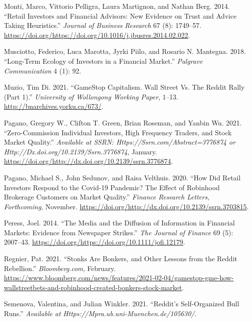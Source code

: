 \documentclass[12pt,]{article}
\begin{document}
\leavevmode\hypertarget{ref-monti2014}{}%
Monti, Marco, Vittorio Pelligra, Laura Martignon, and Nathan Berg. 2014.
``Retail Investors and Financial Advisors: New Evidence on Trust and
Advice Taking Heuristics.'' \emph{Journal of Business Research} 67 (8):
1749--57.
\url{https://doi.org/https://doi.org/10.1016/j.jbusres.2014.02.022}.

\leavevmode\hypertarget{ref-musciotto2018}{}%
Musciotto, Federico, Luca Marotta, Jyrki Piilo, and Rosario N. Mantegna.
2018. ``Long-Term Ecology of Investors in a Financial Market.''
\emph{Palgrave Communication} 4 (1): 92.

\leavevmode\hypertarget{ref-dimuzio2021}{}%
Muzio, Tim Di. 2021. ``GameStop Capitalism. Wall Street Vs. The Reddit
Rally (Part 1).'' \emph{University of Wollongong Working Paper}, 1--13.
\url{http://bnarchives.yorku.ca/673/}.

\leavevmode\hypertarget{ref-eaton2021}{}%
Pagano, Gregory W., Clifton T. Green, Brian Roseman, and Yanbin Wu.
2021. ``Zero-Commission Individual Investors, High Frequency Traders,
and Stock Market Quality.'' \emph{Available at SSRN:
Https://Ssrn.com/Abstract=3776874 or
Http://Dx.doi.org/10.2139/Ssrn.3776874}, January.
\url{https://doi.org/http://dx.doi.org/10.2139/ssrn.3776874}.

\leavevmode\hypertarget{ref-pagano2020}{}%
Pagano, Michael S., John Sedunov, and Raisa Velthuis. 2020. ``How Did
Retail Investors Respond to the Covid-19 Pandemic? The Effect of
Robinhood Brokerage Customers on Market Quality.'' \emph{Finance
Research Letters, Forthcoming}, November.
\href{https://doi.org/http://dx.doi.org/10.2139/ssrn.3703815\%20}{https://doi.org/http://dx.doi.org/10.2139/ssrn.3703815}.

\leavevmode\hypertarget{ref-peress2014}{}%
Peress, Joel. 2014. ``The Media and the Diffusion of Information in
Financial Markets: Evidence from Newspaper Strikes.'' \emph{The Journal
of Finance} 69 (5): 2007--43.
\url{https://doi.org/https://doi.org/10.1111/jofi.12179}.

\leavevmode\hypertarget{ref-regnier2021}{}%
Regnier, Pat. 2021. ``Stonks Are Bonkers, and Other Lessons from the
Reddit Rebellion.'' \emph{Bloomberg.com}, February.
\url{https://www.bloomberg.com/news/features/2021-02-04/gamestop-gme-how-wallstreetbets-and-robinhood-created-bonkers-stock-market}.

\leavevmode\hypertarget{ref-semenova2021}{}%
Semenova, Valentina, and Julian Winkler. 2021. ``Reddit's Self-Organized
Bull Runs.'' \emph{Available at
Https://Mpra.ub.uni-Muenchen.de/105630/}.
\end{document}
